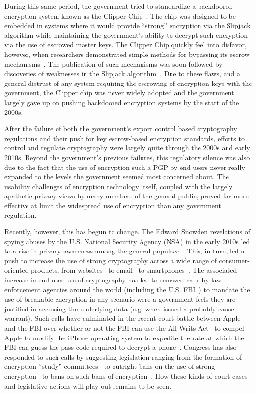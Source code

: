 During this same period, the government tried to standardize a
backdoored encryption system known as the Clipper
Chip~\cite{whitehouse-clipper}. The chip was designed to be embedded
in systems where it would provide ``strong'' encryption via the
Slipjack algorithm while maintaining the government's ability to
decrypt such encryption via the use of escrowed master keys. The
Clipper Chip quickly feel into disfavor, however, when researchers
demonstrated simple methods for bypassing its escrow
mechanisms~\cite{blaze1994}. The publication of such mechanisms was
soon followed by discoveries of weaknesses in the Slipjack
algorithm~\cite{biham1998}. Due to these flaws, and a general distrust
of any system requiring the escrowing of encryption keys with the
government, the Clipper chip was never widely adopted and the
government largely gave up on pushing backdoored encryption systems by
the start of the 2000s.

After the failure of both the government's export control based
cryptography regulations and their push for key escrow-based
encryption standards, efforts to control and regulate cryptography
were largely quite through the 2000s and early 2010s. Beyond the
government's previous failures, this regulatory silence was also due
to the fact that the use of encryption such a PGP by end users never
really expanded to the levels the government seemed most concerned
about. The usability challenges of encryption technology itself,
coupled with the largely apathetic privacy views by many members of
the general public, proved far more effective at limit the widespread
use of encryption than any government regulation.

Recently, however, this has begun to change. The Edward Snowden
revelations of spying abuses by the U.S. National Security Agency
(NSA) in the early 2010s led to a rise in privacy awareness among the
general populace~\cite{pew-privsec14}. This, in turn, led a push to
increase the use of strong cryptography across a wide range of
consumer-oriented products, from websites~\cite{mozilla-deprecatehttp}
to email~\cite{gmail-blog-encryption} to
smartphones~\cite{ars-ios-encrypt, ars-android-encrypt}. The
associated increase in end user use of cryptography has led to renewed
calls by law enforcement agencies around the world (including the U.S.
FBI~\cite{comey-testimony-encryption}) to mandate the use of breakable
encryption in any scenario were a government feels they are justified
in accessing the underlying data (e.g. when issued a probably cause
warrant). Such calls have culminated in the recent court battle
between Apple and the FBI over whether or not the FBI can use the All
Writs Act~\cite{usc-allwrits} to compel Apple to modify the iPhone
operating system to expedite the rate at which the FBI can guess the
pass-code required to decrypt a phone~\cite{ars-cookvfbi}. Congress
has also responded to such calls by suggesting legislation ranging
from the formation of encryption ``study'' committees~\cite{hr4651} to
outright bans on the use of strong encryption~\cite{burrfeinstein} to
bans on such bans of encryption~\cite{hr4528}. How these kinds of
court cases and legislative actions will play out remains to be seen.

